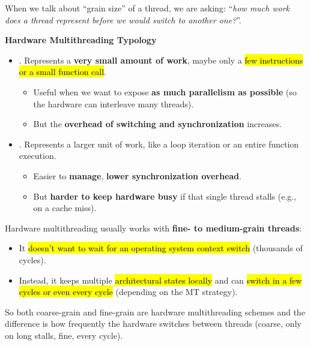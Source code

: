 \highspace
When we talk about ``grain size'' of a thread, we are asking: ``\emph{how much work does a thread represent before we would switch to another one?}''.

\highspace
\textcolor{Green3}{ \textbf{Hardware Multithreading Typology}}
\begin{itemize}
    \item {}. Represents a \textbf{very small amount of work}, maybe only a \hl{few instructions or a small function call}.
    \begin{itemize}
        \item[\textcolor{Green3}{\faIcon{check-circle}}] Useful when we want to expose \textbf{as much parallelism as possible} (so the hardware can interleave many threads).
        \item[\textcolor{Red2}{\faIcon{times-circle}}] But the \textbf{overhead of switching and synchronization} increases.
    \end{itemize}

    \item {}. Represents a larger unit of work, like a loop iteration or an entire function execution.
    \begin{itemize}
        \item[\textcolor{Green3}{\faIcon{check-circle}}] Easier to \textbf{manage}, \textbf{lower synchronization overhead}.
        \item[\textcolor{Red2}{\faIcon{times-circle}}] But \textbf{harder to keep hardware busy} if that single thread stalls (e.g., on a cache miss).
    \end{itemize}
\end{itemize}
Hardware multithreading usually works with \textbf{fine- to medium-grain threads}:
\begin{itemize}
    \item[\textcolor{Red2}{\faIcon{times}}] It \hl{doesn't want to wait for an operating system context switch} (thousands of cycles).
    \item[\textcolor{Green3}{\faIcon{check}}] Instead, it keeps multiple \hl{architectural states locally} and can \hl{switch in a few cycles or even every cycle} (depending on the MT strategy).
\end{itemize}
So both coarse-grain and fine-grain are hardware multithreading schemes and the difference is how frequently the hardware switches between threads (coarse, only on long stalls, fine, every cycle).

